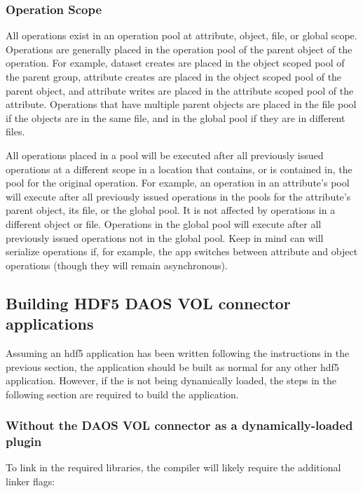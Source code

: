 \documentclass[../users_guide.tex]{subfiles}
\begin{document}
\subsubsection {Operation Scope}

All operations exist in an operation pool at attribute, object, file, or global
scope. Operations are generally placed in the operation pool of the parent
object of the operation. For example, dataset creates are placed in the object
scoped pool of the parent group, attribute creates are placed in the object
scoped pool of the parent object, and attribute writes are placed in the
attribute scoped pool of the attribute. Operations that have multiple parent
objects are placed in the file pool if the objects are in the same file, and in
the global pool if they are in different files.

All operations placed in a pool will be executed after all previously issued
operations at a different scope in a location that contains, or is contained in,
the pool for the original operation. For example, an operation in an attribute's
pool will execute after all previously issued operations in the pools for the
attribute's parent object, its file, or the global pool. It is not affected by
operations in a different object or file. Operations in the global pool will
execute after all previously issued operations not in the global pool. Keep in
mind can will serialize operations if, for example, the app switches between
attribute and object operations (though they will remain asynchronous).

\subsection{Building HDF5 DAOS VOL connector applications}

Assuming an \acrshort{hdf5} application has been written following the instructions in the previous section, the application should be built as normal for any other
\acrshort{hdf5} application. However,
if the \dvc{} is not being dynamically loaded, the steps in the following
section are required to build the application.

\subsubsection{Without the DAOS VOL connector as a dynamically-loaded plugin}

To link in the required libraries, the compiler will likely require the
additional linker flags:
\end{document}
